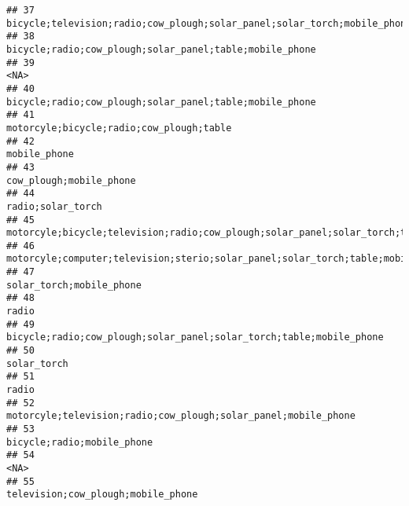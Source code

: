 \documentclass[
]{article}
\begin{document}
\begin{verbatim}
## 37                                                                  bicycle;television;radio;cow_plough;solar_panel;solar_torch;mobile_phone
## 38                                                                                   bicycle;radio;cow_plough;solar_panel;table;mobile_phone
## 39                                                                                                                                      <NA>
## 40                                                                                   bicycle;radio;cow_plough;solar_panel;table;mobile_phone
## 41                                                                                                  motorcyle;bicycle;radio;cow_plough;table
## 42                                                                                                                              mobile_phone
## 43                                                                                                                   cow_plough;mobile_phone
## 44                                                                                                                         radio;solar_torch
## 45                                                  motorcyle;bicycle;television;radio;cow_plough;solar_panel;solar_torch;table;mobile_phone
## 46                                                           motorcyle;computer;television;sterio;solar_panel;solar_torch;table;mobile_phone
## 47                                                                                                                  solar_torch;mobile_phone
## 48                                                                                                                                     radio
## 49                                                                       bicycle;radio;cow_plough;solar_panel;solar_torch;table;mobile_phone
## 50                                                                                                                               solar_torch
## 51                                                                                                                                     radio
## 52                                                                            motorcyle;television;radio;cow_plough;solar_panel;mobile_phone
## 53                                                                                                                bicycle;radio;mobile_phone
## 54                                                                                                                                      <NA>
## 55                                                                                                        television;cow_plough;mobile_phone

\end{verbatim}
\end{document}
